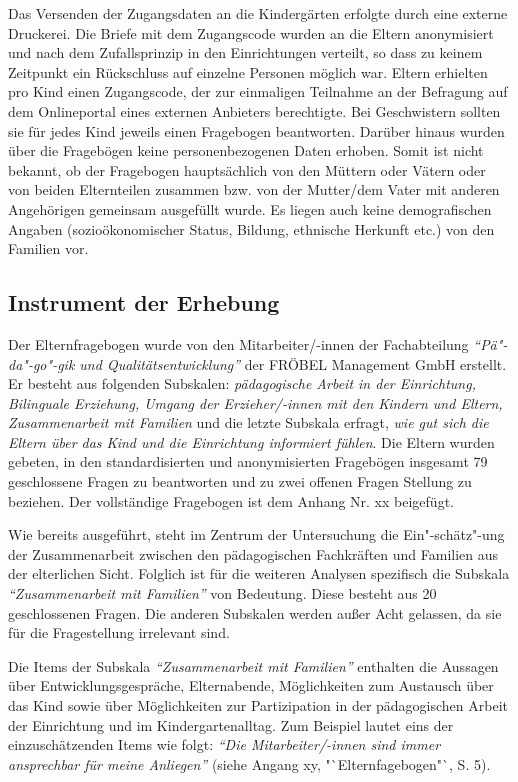 \documentclass[12pt,a4paper]{article}
\begin{document}
	Das Versenden der Zugangsdaten an die Kindergärten erfolgte durch eine externe Druckerei. Die Briefe mit dem Zugangscode wurden an die Eltern anonymisiert und nach dem Zufallsprinzip in den Einrichtungen verteilt, so dass zu keinem Zeitpunkt ein Rückschluss auf einzelne Personen möglich war. Eltern erhielten pro Kind einen Zugangscode, der zur einmaligen Teilnahme an der Befragung auf dem Onlineportal eines externen Anbieters berechtigte. Bei Geschwistern sollten sie für jedes Kind jeweils einen Fragebogen beantworten. Darüber hinaus wurden über die Fragebögen keine personenbezogenen Daten erhoben. Somit ist nicht bekannt, ob der Fragebogen hauptsächlich von den Müttern oder Vätern oder von beiden Elternteilen zusammen bzw. von der Mutter/dem Vater mit anderen Angehörigen gemeinsam ausgefüllt wurde. Es liegen auch keine demografischen Angaben (sozioökonomischer Status, Bildung, ethnische Herkunft etc.) von den Familien vor.

\subsection{Instrument der Erhebung} 
Der Elternfragebogen wurde von den Mitarbeiter/-innen der Fachabteilung \textit{"`Pä"-da"-go"-gik und Qualitätsentwicklung"'} der FRÖBEL Management GmbH erstellt. Er besteht aus folgenden Subskalen: \textit{pädagogische Arbeit in der Einrichtung, Bilinguale Erziehung, Umgang der Erzieher/-innen mit den Kindern und Eltern, Zusammenarbeit mit Familien} und die letzte Subskala erfragt, \textit{wie gut sich die Eltern über das Kind und die Einrichtung informiert fühlen}. Die Eltern wurden gebeten, in den standardisierten und anonymisierten Fragebögen insgesamt 79 geschlossene Fragen zu beantworten und zu zwei offenen Fragen Stellung zu beziehen. Der vollständige Fragebogen ist dem Anhang Nr. xx beigefügt. %

	Wie bereits ausgeführt, steht im Zentrum der Untersuchung die Ein"-schätz"-ung der Zusammenarbeit zwischen den pädagogischen Fachkräften und Familien aus der elterlichen Sicht. Folglich ist für die weiteren Analysen spezifisch die Subskala \textit{"`Zusammenarbeit mit Familien"'} von Bedeutung. Diese besteht aus 20 geschlossenen Fragen. Die anderen Subskalen werden außer Acht gelassen, da sie für die Fragestellung irrelevant sind.
	
	Die Items der Subskala \textit{"`Zusammenarbeit mit Familien"'} enthalten die Aussagen über Entwicklungsgespräche, Elternabende, Möglichkeiten zum Austausch über das Kind sowie über Möglichkeiten zur Partizipation in der pädagogischen Arbeit der Einrichtung und im Kindergartenalltag. Zum Beispiel lautet eins der einzuschätzenden Items wie folgt: \textit{"`Die Mitarbeiter/-innen sind immer ansprechbar für meine Anliegen"'} (siehe Angang xy, "`Elternfagebogen"`, S. 5). %
	
\end{document}
